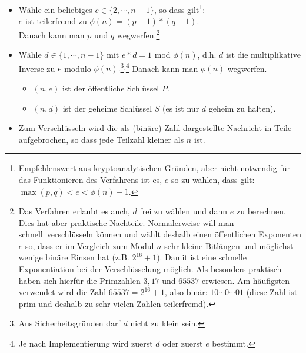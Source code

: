 \begin{refsegment}
\begin{itemize}
\item[\textbf{2.}] Wähle ein beliebiges $e \in \{2, \cdots, n-1\}$, so dass
                gilt\footnote{%
                \label{foot:Selection-of-e}%
                Empfehlenswert aus kryptoanalytischen Gründen, aber nicht
                notwendig für das Funktionieren des Verfahrens ist es, $e$ so
                zu wählen, dass gilt:
                $\max(p,q) < e < \phi(n) - 1$.}:\\
                $e$ ist teilerfremd
                zu $\phi(n) = (p-1)*(q-1)$.\\
                Danach kann man $p$ und $q$ \glqq wegwerfen\grqq.\footnote{%
                Das Verfahren erlaubt es auch, $d$ frei zu wählen und dann
                $e$ zu berechnen.
                Dies hat aber praktische Nachteile.
                Normalerweise will man \glqq schnell\grqq~verschlüsseln können
                und wählt deshalb einen öffentlichen Exponenten $e$ so, dass
                er im Vergleich zum Modul $n$ sehr kleine Bitlängen und
                möglichst wenige binäre Einsen hat (z.B. $2^{16} + 1$).
                Damit ist eine schnelle Exponentiation bei der
                Verschlüsselung möglich.
                Als besonders praktisch haben sich hierfür die
                Primzahlen $3, 17$ und $65537$ erwiesen.
                Am häufigsten verwendet wird die Zahl $65537 = 2^{16}+1$,
                also binär: $10\cdots 0\cdots 01$ (diese Zahl ist prim und
                deshalb zu sehr vielen Zahlen teilerfremd).
                }
\item[\textbf{3.}] Wähle $d \in \{1, \cdots, n-1\}$  mit  $e*d = 1$  mod $\phi(n)$,
      d.h. $d$ ist die multiplikative Inverse zu $e$ modulo $\phi(n).$\footnote{%
      Aus Sicherheitsgründen darf $d$ nicht zu klein sein.
      }$^,$\footnote{%
      Je nach Implementierung wird zuerst $d$ oder zuerst $e$ bestimmt.
      } Danach kann man $\phi(n)$ \glqq wegwerfen\grqq.
  \begin{itemize}
      \item[$\rightarrow$] $(n, e)$ ist der öffentliche Schlüssel $P$.
      \item[$\rightarrow$] $(n, d)$ ist der geheime Schlüssel $S$ (es
            ist nur $d$ geheim zu halten).
  \end{itemize}
\item[\textbf{4.}] Zum Verschlüsseln wird die als (binäre) Zahl dargestellte Nachricht in Teile
                aufgebrochen, so dass jede Teilzahl kleiner als $n$ ist.

\end{itemize}
\end{refsegment}
